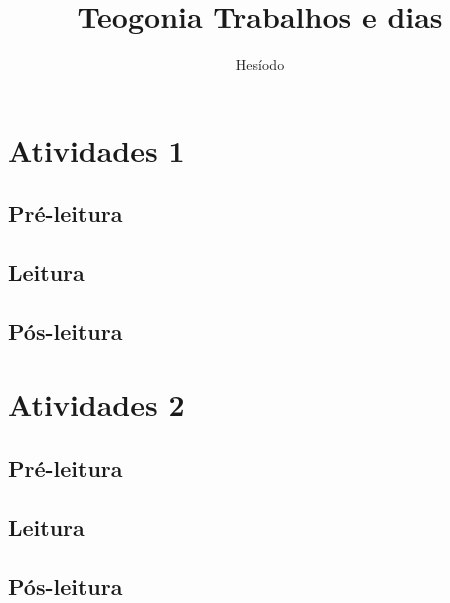 \documentclass{extarticle}
\begin{document}
\newcommand{\AutorLivro}{Hesíodo}
\newcommand{\TituloLivro}{Teogonia \newcommand{\TituloLivro}{Poema} Trabalhos e dias}
\newcommand{\Tema}{Ficção, mistério e fantasia}
\newcommand{\Genero}{Poema}
\newcommand{\issnppub}{---}
\newcommand{\issnepub}{---}
\newcommand{\colaborador}{\textbf{Fulano de Tal} é uma pessoa incrível e vai fazer um bom serviço.}


\title{\TituloLivro}
\author{\AutorLivro}
\def\authornotes{\colaborador}

\date{}
\maketitle
\tableofcontents




\section{Atividades 1}


\subsection{Pré-leitura}
\subsection{Leitura}
\subsection{Pós-leitura}



\section{Atividades 2}

\subsection{Pré-leitura}
\subsection{Leitura}
\subsection{Pós-leitura}

\lipsum
\end{document}
